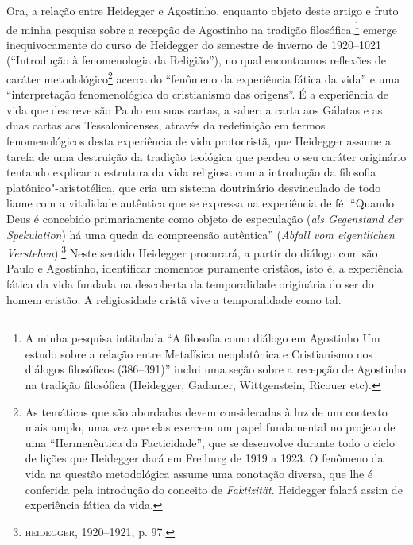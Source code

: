 Ora, a relação entre Heidegger e Agostinho, enquanto objeto deste
artigo e fruto de minha pesquisa sobre a recepção de Agostinho
na tradição filosófica,\footnote{  A minha pesquisa
intitulada “A filosofia como diálogo em Agostinho  Um estudo
sobre a relação entre  Metafísica neoplatônica e Cristianismo
nos diálogos filosóficos (386--391)” inclui uma seção sobre a
recepção de Agostinho na tradição filosófica (Heidegger,
Gadamer, Wittgenstein, Ricouer etc).} emerge inequivocamente
do curso de Heidegger do semestre de inverno de 1920--1021
(“Introdução à fenomenologia da Religião”), no qual encontramos
reflexões de caráter metodológico\footnote{   As temáticas
que são abordadas devem consideradas à luz de um contexto mais
amplo, uma vez que elas exercem um papel fundamental no projeto
de uma “Hermenêutica da Facticidade”, que se desenvolve durante
todo o ciclo de lições que Heidegger dará em Freiburg de 1919 a
1923. O fenômeno da vida na questão metodológica assume uma
conotação diversa, que lhe é conferida pela introdução do
conceito de \emph{Faktizität}. Heidegger falará assim de
experiência fática da vida.} acerca do “fenômeno da experiência
fática da vida” e uma “interpretação fenomenológica do
cristianismo das origens”. É a experiência de vida que descreve
são Paulo em suas cartas, a saber: a carta aos Gálatas e as duas
cartas aos Tessalonicenses, através da redefinição em termos
fenomenológicos desta experiência de vida protocristã, que
Heidegger assume a tarefa de uma destruição da tradição
teológica que perdeu o seu caráter originário tentando explicar
a estrutura da vida religiosa com a introdução da filosofia
platônico"-aristotélica, que cria um sistema doutrinário
desvinculado de todo liame com a vitalidade autêntica que se
expressa na experiência de fé. “Quando Deus é concebido
primariamente como objeto de especulação (\emph{als Gegenstand
der Spekulation}) há uma queda da compreensão autêntica”
(\emph{Abfall vom eigentlichen Verstehen}).\footnote{ 
\textsc{heidegger}, 1920--1921, p. 97.}  Neste sentido Heidegger
procurará, a partir do diálogo com são Paulo e Agostinho,
identificar momentos puramente cristãos, isto é, a experiência
fática da vida fundada na descoberta da temporalidade originária
do ser do homem cristão. A religiosidade cristã vive a
temporalidade como tal.

